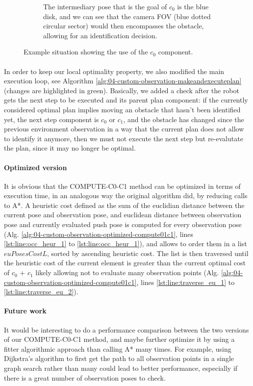 \begin{figure}[H]
\begin{subfigure}{.48\textwidth}
  \caption{The intermediary pose that is the goal of $c_{0}$ is the blue disk, and we can see that the camera FOV (blue dotted circular sector) would then encompasses the obstacle, allowing for an identification decision.}
  \label{fig:observation_02}
\end{subfigure}
\caption{Example situation showing the use of the $c_{0}$ component.}
\label{fig:observation_example}
\end{figure}

\paragraph{} In order to keep our local optimality property, we also modified the main execution loop, see Algorithm \ref{alg:04-custom-observation-makeandexecuteplan} (changes are highlighted in green). Basically, we added a check after the robot gets the next step to be executed and its parent plan component: if the currently considered optimal plan implies moving an obstacle that hasn't been identified yet, the next step component is $c_{0}$ or $c_{1}$, and the obstacle has changed since the previous environment observation in a way that the current plan does not allow to identify it anymore, then we must not execute the next step but re-evalutate the plan, since it may no longer be optimal.

\paragraph{Optimized version} It is obvious that the COMPUTE-C0-C1 method can be optimized in terms of execution time, in an analogous way the original algorithm did, by reducing calls to A*. A heuristic cost defined as the sum of the euclidian distance between the current pose and observation pose, and euclidean distance between observation pose and currently evaluated push pose is computed for every observation pose (Alg. \ref{alg:04-custom-observation-optimized-compute01c1}, lines \ref{lst:line:occ_heur_1} to \ref{lst:line:occ_heur_1}), and allows to order them in a list $euPosesCostL$, sorted by ascending heuristic cost. The list is then traversed until the heuristic cost of the current element is greater than the current optimal cost of $c_{0}$ + $c_{1}$ likely allowing not to evaluate many observation points (Alg. \ref{alg:04-custom-observation-optimized-compute01c1}, lines \ref{lst:line:traverse_eu_1} to \ref{lst:line:traverse_eu_2}).

\paragraph{Future work} It would be interesting to do a performance comparison between the two versions of our COMPUTE-C0-C1 method, and maybe further optimize it by using a fitter algorithmic approach than calling A* many times. For example, using Dijkstra's algorithm to first get the path to all observation points in a single graph search rather than many could lead to better performance, especially if there is a great number of observation poses to check.


